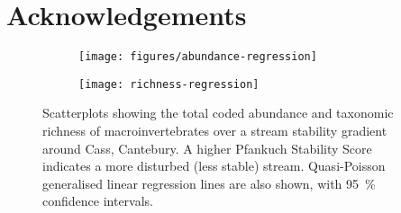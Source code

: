 \documentclass[a4paper,10pt]{article}
\begin{document}
\section*{Acknowledgements}

\clearpage

\begin{figure}[p]
	\centering
	\begin{subfigure}[t]{\textwidth}
		\centering
		\texttt{[image: figures/abundance-regression]}
		\caption{}\label{fig:abundance-regression}
	\end{subfigure}
	\begin{subfigure}[t]{\textwidth}
		\centering
		\texttt{[image: richness-regression]}
		\caption{}\label{fig:richness-regression}
	\end{subfigure}
	\caption[Regression plots]{ %
		Scatterplots showing the total coded abundance and taxonomic richness of macroinvertebrates over a stream stability gradient around Cass, Cantebury.
		A higher Pfankuch Stability Score indicates a more disturbed (less stable) stream.
		Quasi-Poisson generalised linear regression lines are also shown, with \SI{95}{\percent} confidence intervals.
	}\label{fig:regressions}
\end{figure}



\FloatBarrier
\printbibliography
\end{document}
